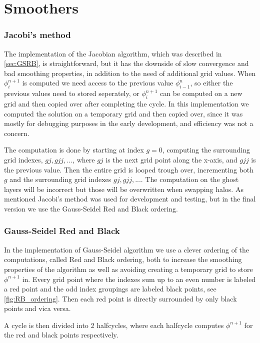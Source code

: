 
	\section{Smoothers}
		\subsubsection{Jacobi's method}
		The implementation of the Jacobian algorithm, which was described in \cref{sec:GSRB}, is straightforward, but it has the downside of slow convergence and
		bad smoothing properties, in addition to the need of additional grid values. When \(\phi^{n+1}_{i}\) is computed
		we need access to the previous value \(\phi^n_{i-1}\), so either the previous values
		need to stored seperately, or \(\phi^{n+1}_{i}\) can be computed on a new grid and then copied over after completing the cycle.
		In this implementation we computed the solution on a temporary grid and then copied over, since it was mostly for debugging purposes in the early development, and
		efficiency was not a concern.

		The computation is done by starting at index \(g=0\), computing the surrounding grid indexes, \(gj, gjj,...\), where \(gj\)
		is the next grid point along the x-axis, and \(gjj\) is the previous value. Then the entire grid is looped trough over, incrementing
		both \(g\) and the surrounding grid indexes \(gj, gjj,...\). The computation on the ghost layers will be incorrect but those will be overwritten
		when swapping halos. As mentioned Jacobi's method was used for development and testing, but in the final version we use the Gauss-Seidel Red and Black ordering.


		\subsubsection{Gauss-Seidel Red and Black}
		In the implementation of Gauss-Seidel algorithm we use a clever ordering of the computations,
		called Red and Black ordering, both to increase the smoothing properties of the algorithm as well as avoiding
 		creating a temporary grid to store \(\phi^{n+1}\) in. Every grid point where the indexes sum up to an even number
		is labeled a red point and the odd index groupings are labeled black points, see \cref{fig:RB_ordering}. Then
		each red point is directly surrounded by only black points and vica versa.

		A cycle is then divided into 2 halfcycles, where each halfcycle computes \(\phi^{n+1}\) for the red and black points respectively.


